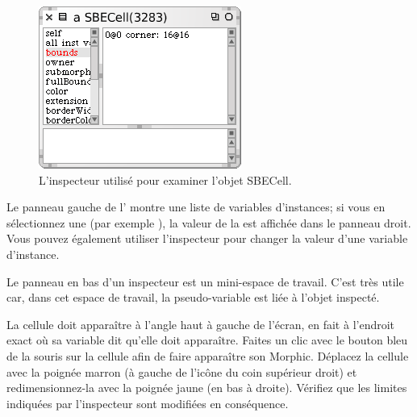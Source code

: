 \documentclass[a4paper,10pt,twoside]{book}
\begin{document}

\begin{figure}[htbp]
   \centering
   \includegraphics[scale=0.7]{SBECellInspector} 
   \caption{L'inspecteur utilisé pour examiner l'objet SBECell.\label{fig:SBECellInspector}}
\end{figure}

Le panneau gauche de l' montre une liste de variables d'instances; si vous en sélectionnez une (par exemple \mbox{),} la valeur de la  est affichée dans le panneau droit. Vous pouvez également utiliser l'inspecteur pour changer la valeur d'une variable d'instance.


Le panneau en bas d'un inspecteur est un mini-espace de travail. C'est très utile car, dans cet espace de travail, la pseudo-variable \self est liée à l'objet inspecté.

La cellule doit apparaître à l'angle haut à gauche de l'écran, en fait à l'endroit exact o\`u sa variable  dit qu'elle doit apparaître.
Faites un clic avec le bouton bleu de la souris sur la cellule afin de faire apparaître son  Morphic.
Déplacez la cellule avec la poignée marron (à 
gauche de l'ic\^one du coin supérieur droit) et redimensionnez-la avec la poignée jaune (en bas à droite).
Vérifiez que les limites indiquées par l'inspecteur sont modifiées en conséquence.
\end{document}

